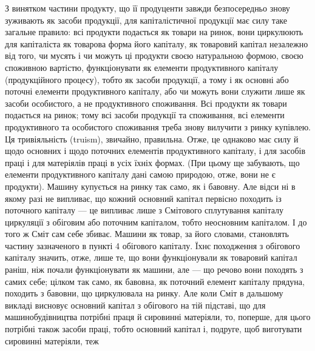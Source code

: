 З винятком частини продукту, що її продуценти завжди безпосередньо
знову зуживають як засоби продукції, для капіталістичної продукції
має силу таке загальне правило: всі продукти подається як товари на ринок,
вони циркулюють для капіталіста як товарова форма його капіталу, як товаровий
капітал незалежно від того, чи мусять і чи можуть ці продукти
своєю натуральною формою, своєю споживною вартістю, функціонувати як
елементи продуктивного капіталу (продукційного процесу), тобто як засоби
продукції, а тому і як основні або поточні елементи продуктивного капіталу,
або чи можуть вони служити лише як засоби особистого, а не продуктивного
споживання. Всі продукти як товари подається на ринок;
тому всі засоби продукції та споживання, всі елементи продуктивного та
особистого споживання треба знову вилучити з ринку купівлею. Ця тривіяльність
(truism), звичайно, правильна. Отже, це однаково має силу й
щодо основних і щодо поточних елементів продуктивного капіталу, і
для засобів праці і для матеріялів праці в усіх їхніх формах. (При цьому
ще забувають, що елементи продуктивного капіталу дані самою природою,
отже, вони не є продукти). Машину купується на ринку так само,
як і бавовну. Але відси ні в якому разі не випливає, що кожний основний
капітал первісно походить із поточного капіталу — це випливає лише
з Смітового сплутування капіталу циркуляції з обіговим або поточним
капіталом, тобто неосновним капіталом. І до того ж Сміт сам себе збиває.
Машини як товар, за його словами, становлять частину зазначеного
в пункті 4 обігового капіталу. Їхнє походження з обігового капіталу значить,
отже, лише те, що вони функціонували як товаровий капітал раніш,
ніж почали функціонувати як машини, але — що речово вони походять
з самих себе; цілком так само, як бавовна, як поточний елемент капіталу
прядуна, походить з бавовни, що циркулювала на ринку. Але коли
Сміт в дальшому викладі висновує основний капітал з обігового на
тій підставі, що для машинобудівництва потрібні праця й сировинні матеріяли,
то, поперше, для цього потрібні також засоби праці, тобто основний
капітал і, подруге, щоб виготувати сировинні матеріяли, теж
\parbreak{}  %
